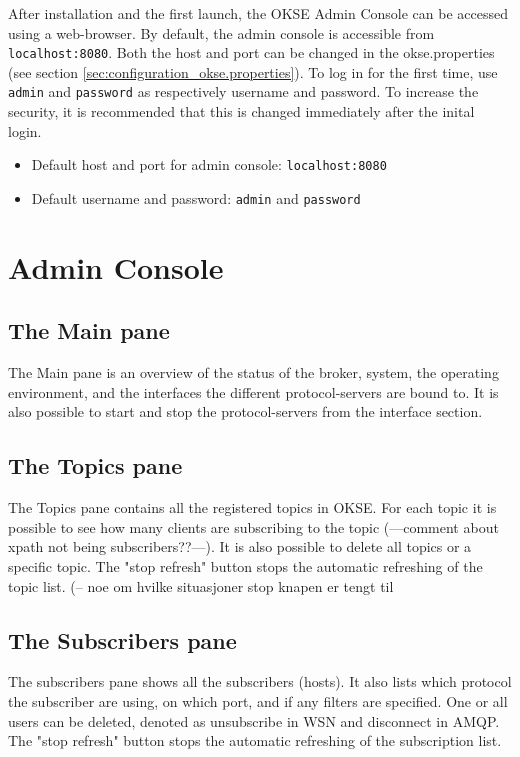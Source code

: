 After installation and the first launch, the OKSE Admin Console can be accessed using a web-browser. By default, the admin console is accessible from \verb!localhost:8080!. Both the host and port can be changed in the okse.properties (see section \ref{sec:configuration_okse.properties}). To log in for the first time, use \verb!admin! and \verb!password! as respectively username and password. To increase the security, it is recommended that this is changed immediately after the inital login. 

\begin{itemize}
\setlength{\itemsep}{0cm}%
\item Default host and port for admin console: \verb!localhost:8080!
\item Default username and password: \verb!admin! and \verb!password!
\end{itemize}

\section{Admin Console}

\subsection{The Main pane}
The Main pane is an overview of the status of the broker, system, the operating environment, and the interfaces the different protocol-servers are bound to. It is also possible to start and stop the protocol-servers from the interface section.

\subsection{The Topics pane}
The Topics pane contains all the registered topics in OKSE. For each topic it is possible to see how many clients are subscribing to the topic (---comment about xpath not being subscribers??---). It is also possible to delete all topics or a specific topic. The "stop refresh" button stops the automatic refreshing of the topic list. (-- noe om hvilke situasjoner stop knapen er tengt til

\subsection{The Subscribers pane}
The subscribers pane shows all the subscribers (hosts). It also lists which protocol the subscriber are using, on which port, and if any filters are specified. One or all users can be deleted, denoted as unsubscribe in WSN and disconnect in AMQP. The "stop refresh" button stops the automatic refreshing of the subscription list.

